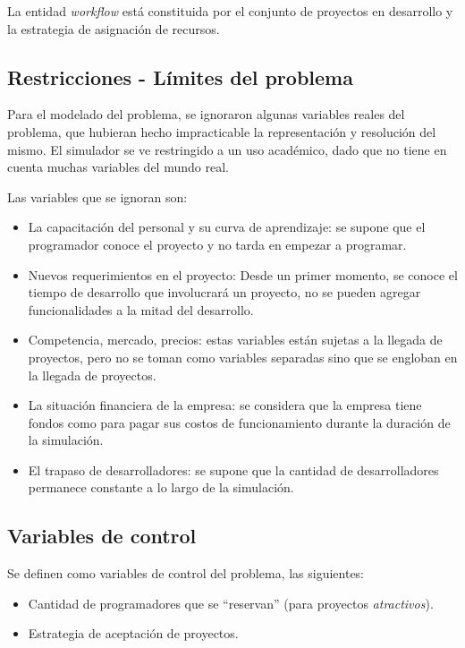 La entidad \textit{workflow} está constituida por el conjunto de proyectos en desarrollo y la estrategia de asignación de recursos.\\

\subsection{Restricciones - Límites del problema}

Para el modelado del problema, se ignoraron algunas variables reales del problema, que hubieran hecho impracticable la representación y resolución del mismo. El simulador se ve 
restringido a un uso académico, dado que no tiene en cuenta muchas variables del mundo real.

Las variables que se ignoran son: \\

\begin{itemize}
    \item La capacitación del personal y su curva de aprendizaje: se supone que el programador conoce el proyecto y no tarda en empezar a programar.
    \item Nuevos requerimientos en el proyecto: Desde un primer momento, se conoce el tiempo de desarrollo que involucrará un proyecto, no se pueden agregar 
            funcionalidades a la mitad del desarrollo.
    \item Competencia, mercado, precios: estas variables están sujetas a la llegada de proyectos, pero no se toman como variables separadas sino que se engloban en la 
        llegada de proyectos.
    \item La situación financiera de la empresa: se considera que la empresa tiene fondos como para pagar sus costos de funcionamiento durante la duración de la simulación.
    \item El trapaso de desarrolladores: se supone que la cantidad de desarrolladores permanece constante a lo largo de la simulación.
\end{itemize}

\subsection{Variables de control}
Se definen como variables de control del problema, las siguientes:

\begin{itemize}
    \item Cantidad de programadores que se ``reservan'' (para proyectos \textit{atractivos}).
    \item Estrategia de aceptación de proyectos.
\end{itemize}


